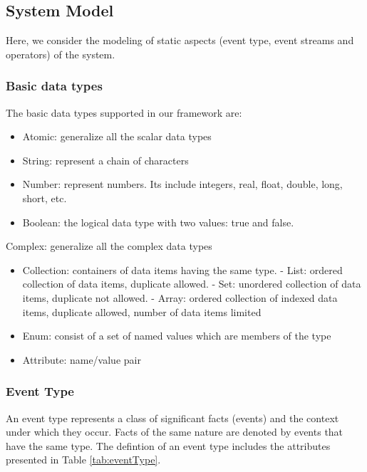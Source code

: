 \documentclass[a4paper,twoside]{article}
\begin{document}
\subsection{System Model}
Here, we consider the modeling of static aspects (event type, event streams and operators) of the system.
\subsubsection{Basic data types}
The basic data types supported in our framework are:
\begin{itemize}
\item Atomic: generalize all the scalar data types
\item String: represent a chain of characters
\item Number: represent numbers. Its include integers, real, float, double, long, short, etc.  
\item Boolean: the logical data type with two values: true and false.
\end{itemize}
Complex: generalize all the complex data types
\begin{itemize}
\item Collection: containers of data items having the same type.
\subitem - List: ordered collection of data items, duplicate allowed.
\subitem - Set: unordered collection of data items, duplicate not allowed.
\subitem - Array: ordered collection of indexed data items,  duplicate allowed,  number of data items limited
\item Enum: consist of a set of named values which are members of the type
\item Attribute: name/value pair
\end{itemize}
\subsubsection{Event Type}
An event type represents a class of significant facts (events) and the context under which they occur. Facts of the same nature are denoted by events that have the same type. The defintion of an event type includes the attributes presented in Table \ref{tab:eventType}.
\end{document}
